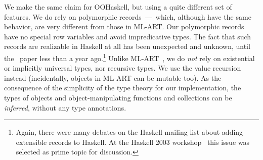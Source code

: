 We make the same claim for OOHaskell, but using a quite different set
of features. We do rely on polymorphic records~---~which, although
have the same behavior, are very different from those in ML-ART. Our
polymorphic records have no special row variables and avoid
impredicative types. The fact that such records are realizable in
Haskell at all has been unexpected and unknown, until the \HList\
paper less than a year ago.\footnote{Again, there were many debates on
the Haskell mailing list about adding extensible records to
Haskell. At the Haskell 2003 workshop~\cite{HW03} this issue was
selected as prime topic for discussion.} Unlike ML-ART~\cite{ML-ART},
we do \emph{not} rely on existential or implicitly universal types,
nor recursive types. We use the value recursion instead (incidentally,
objects in ML-ART can be mutable too). As the consequence of the
simplicity of the type theory for our implementation, the types of
objects and object-manipulating functions and collections can be
\emph{inferred}, without any type annotations.

%
%

\begin{comment}
Such an extension (equi-recursive types)
 to Haskell was also debated and then rejected
because it will make type-error messages nearly
useless~\cite{Hughes02}. There is an alternative technique for
encoding objects: eschew recursive types in favour of existential
quantification~\cite{PT94}. Unfortunately, the involved higher-ranked
types can not be inferred anymore. Explicit signatures were required,
which, in practical terms, means that the user must explicitly
enumerate all virtual methods in the signature of any function that
operates on an object. This technique cannot be used in OOHaskell
because we would like OOP to be easy to use, first, by Haskell
programmer. That is, we ought to preserve type inference for functions
that use objects. Type inference is the great advantage of Haskell and
ML and is worth fighting for. 
\end{comment}

\begin{comment}
\ralf{Variance: since we don't do in the paper, this is odd.
Either we should dive into it in the advanced section,
or leave it out.}
\oleg{We have the code for that, it's already in the archive. I submit
  we still can mention it, just to keep people interested and keep
  asking questions.}

Another theoretical problem -- even with mutable objects -- is the
controversy regarding covariance and contravariance of method
arguments \cite{SG04}, \cite{catcall}. Our work shows how to implement
often desirable covariant methods and statically guarantee
soundness. Due to the lack of space, we merely skim the topic and
refer the reader to the code (and the next paper).
\end{comment}



